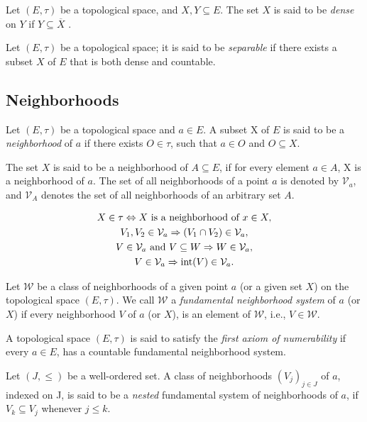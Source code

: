 \begin{definition}
	Let $(E,\tau)$ be a topological space, and $X, Y \subseteq E$. The set $X$ is said to be \emph{dense} on $Y$ if $Y \subseteq \overline{X}$ .
\end{definition}


\begin{definition}
	Let $(E, \tau)$ be a topological space; it is said to be \emph{separable} if there exists a subset $X$ of $E$ that is both dense and countable.
\end{definition}

\subsection{Neighborhoods}

\begin{definition}
	Let $(E, \tau)$ be a topological space and $a \in E$. A subset X of $E$ is said to be a \emph{neighborhood} of $a$ if there exists $O \in \tau$, such that $a \in O$ and $O \subseteq X$. \par
	The set $X$ is said to be a neighborhood of $A \subseteq E$, if for every element $a \in A$, X is a neighborhood of $a$. The set of all neighborhoods of a point $a$ is denoted by $\mathcal{V}_a$, and $\mathcal{V}_A$ denotes the set of all neighborhoods of an arbitrary set $A$. 
\end{definition}

\begin{proposition}
	\begin{gather*}
		X \in \tau \Leftrightarrow X \text{ is a neighborhood of } x \in X, \\
		V_1, V_2 \in \mathcal{V}_a \Rightarrow (V_1 \cap V_2) \in \mathcal{V}_a, \\
		V \in \mathcal{V}_a \text{ and } V \subseteq W \Rightarrow W \in \mathcal{V}_a, \\
		V \in \mathcal{V}_a \Rightarrow \operatorname{int}(V) \in \mathcal{V}_a.
	\end{gather*}
\end{proposition}

\begin{definition}
	Let $\mathcal{W}$ be a class of neighborhoods of a given point $a$ (or a given set $X$) on the topological space $(E, \tau)$. We call $\mathcal{W}$ a \emph{fundamental neighborhood system} of $a$ (or $X$) if every neighborhood $V$ of $a$ (or $X$), is an element of $\mathcal{W}$, i.e., $V \in \mathcal{W}$.  
\end{definition}

\begin{definition}
	A topological space $(E, \tau)$ is said to satisfy the \emph{first axiom of numerability} if every $a \in E$, has a countable fundamental neighborhood system. 
\end{definition}

\begin{definition}
	Let $(J, \leq)$ be a well-ordered set. A class of neighborhoods $(V_j)_{j \in J}$ of $a$, indexed on J, is said to be a \emph{nested} fundamental system of neighborhoods of $a$, if $V_k \subseteq V_j$ whenever $j \leq k$. 
\end{definition}
